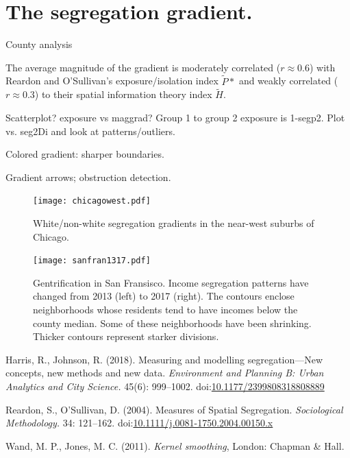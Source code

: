 \documentclass{article}
\theoremstyle{theorem}
\theoremstyle{definition}
\begin{document}
\section{The segregation gradient.}

County analysis

The average magnitude of the gradient is moderately correlated ($r \approx 0.6$) with Reardon and O'Sullivan's exposure/isolation index $\tilde{P}*$ and weakly correlated ($r\approx 0.3$) to their spatial information theory index $\tilde{H}$.

Scatterplot? exposure vs maggrad? Group 1 to group 2 exposure is 1-segp2. Plot vs. seg2Di and look at patterns/outliers.

Colored gradient: sharper boundaries.

Gradient arrows; obstruction detection.

\begin{figure}
  \texttt{[image: chicagowest.pdf]}
  \caption{White/non-white segregation gradients in the near-west suburbs of Chicago.}
  \label{fig:chicagowest}
\end{figure}

\begin{figure}
  \texttt{[image: sanfran1317.pdf]}
  \caption{Gentrification in San Fransisco. Income segregation patterns have changed from 2013 (left) to 2017 (right). The contours enclose neighborhoods whose residents tend to have incomes below the county median. Some of these neighborhoods have been shrinking. Thicker contours represent starker divisions.}
  \label{fig:sanfran1317}
\end{figure}


\begin{thebibliography}{3}

Harris, R., Johnson, R. (2018). Measuring and modelling segregation---New concepts, new methods and new data. \textit{Environment and Planning B: Urban Analytics and City Science.} 45(6): 999--1002. doi:\href{http://dx.doi.org/10.1177/2399808318808889}{10.1177/2399808318808889}

Reardon, S., O'Sullivan, D. (2004). Measures of Spatial Segregation. \textit{Sociological Methodology.} 34: 121--162. doi:\href{http://dx.doi.org/10.1111/j.0081-1750.2004.00150.x}{10.1111/j.0081-1750.2004.00150.x}

 Wand, M. P., Jones, M. C. (2011). \textit{Kernel smoothing}, London: Chapman \& Hall.

\end{thebibliography}
\end{document}
